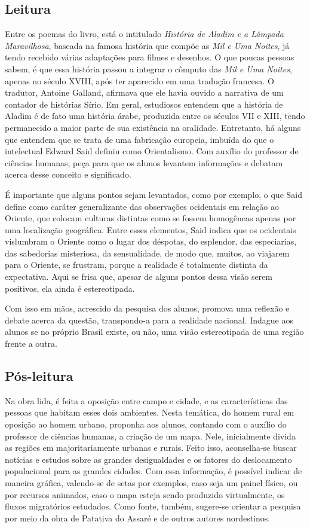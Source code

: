 \documentclass{extarticle}
\begin{document}
\subsection{Leitura}

Entre os poemas do livro, está o intitulado \emph{História
de Aladim e a Lâmpada Maravilhosa}, baseada na famosa história que
compõe as \emph{Mil e Uma Noites}, já tendo recebido várias adaptações
para filmes e desenhos. O que poucas pessoas sabem, é que essa história
passou a integrar o cômputo das \emph{Mil e Uma Noites}, apenas no
século XVIII, após ter aparecido em uma tradução francesa. O tradutor,
Antoine Galland, afirmava que ele havia ouvido a narrativa de um
contador de histórias Sírio. Em geral, estudiosos entendem que a
história de Aladim é de fato uma história árabe, produzida entre os
séculos VII e XIII, tendo permanecido a maior parte de sua existência na
oralidade. Entretanto, há alguns que entendem que se trata de uma
fabricação europeia, imbuída do que o intelectual Edward Said definiu
como Orientalismo. Com auxílio do professor de ciências humanas, peça
para que os alunos levantem informações e debatam acerca desse conceito
e significado.

É importante que alguns pontos sejam levantados, como por exemplo, o que
Said define como caráter generalizante das observações ocidentais em
relação ao Oriente, que colocam culturas distintas como se fossem
homogêneas apenas por uma localização geográfica. Entre esses elementos,
Said indica que os ocidentais vislumbram o Oriente como o lugar dos
déspotas, do esplendor, das especiarias, das sabedorias misteriosa, da
sensualidade, de modo que, muitos, ao viajarem para o Oriente, se
frustram, porque a realidade é totalmente distinta da expectativa. Aqui
se frisa que, apesar de alguns pontos dessa visão serem positivos, ela
ainda é estereotipada.

Com isso em mãos, acrescido da pesquisa dos alunos, promova uma reflexão
e debate acerca da questão, transpondo-a para a realidade nacional.
Indague aos alunos se no próprio Brasil existe, ou não, uma visão
estereotipada de uma região frente a outra.

\subsection{Pós-leitura}

Na obra lida, é feita a oposição entre campo e cidade, e as
características das pessoas que habitam esses dois ambientes. Nesta
temática, do homem rural em oposição ao homem urbano, proponha aos
alunos, contando com o auxílio do professor de ciências humanas, a
criação de um mapa. Nele, inicialmente divida as regiões em
majoritariamente urbanas e rurais. Feito isso, aconselha-se buscar
notícias e estudos sobre as grandes desigualdades e os fatores do
deslocamento populacional para as grandes cidades. Com essa informação,
é possível indicar de maneira gráfica, valendo-se de setas por exemplos,
caso seja um painel físico, ou por recursos animados, caso o mapa esteja
sendo produzido virtualmente, os fluxos migratórios estudados. Como
fonte, também, sugere-se orientar a pesquisa por meio da obra de
Patativa do Assaré e de outros autores nordestinos.
\end{document}
